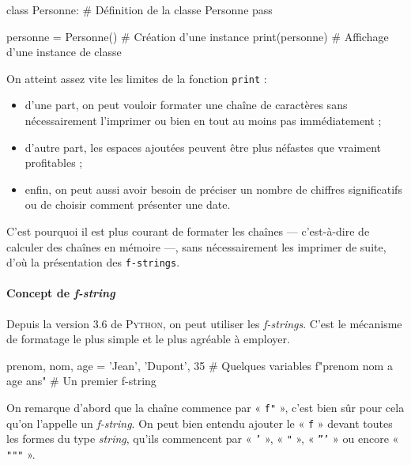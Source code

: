\begin{idleconsole}
\begin{pyconsole}
class Personne: # Définition de la classe Personne
	pass

personne = Personne() # Création d'une instance
print(personne) # Affichage d'une instance de classe
\end{pyconsole}
\end{idleconsole}

On atteint assez vite les limites de la fonction \texttt{print} :
\begin{itemize}
\item d'une part, on peut vouloir formater une chaîne de caractères sans nécessairement l'imprimer ou bien en tout au moins pas immédiatement ;
\item d'autre part, les espaces ajoutées peuvent être plus néfastes que vraiment profitables ;
\item enfin, on peut aussi avoir besoin de préciser un nombre de chif\-fres significatifs ou de choisir comment présenter une date.
\end{itemize}

C'est pourquoi il est plus courant de formater les chaînes --- c'est-à-dire de calculer des chaînes en mémoire ---, sans nécessairement les imprimer de suite, d'où la présentation des \texttt{f-strings}.

\paragraph{Concept de \textit{f-string}}
Depuis la version 3.6 de \textsc{Python}, on peut utiliser les \textit{f-strings}. C'est le mécanisme de formatage le plus simple et le plus agréable à employer.

\begin{idleconsole}
	\begin{pyconsole}
		prenom, nom, age = 'Jean', 'Dupont', 35 # Quelques variables
		f"{prenom} {nom} a {age} ans" # Un premier f-string
	\end{pyconsole}
\end{idleconsole}

On remarque d'abord que la chaîne commence par « \texttt{f"} », c'est bien sûr pour cela qu'on l'appelle un \textit{f-string}.
On peut bien entendu ajouter le « \texttt{f} » devant toutes les formes du type \textit{string}, qu'ils commencent par « \texttt{'} », « \texttt{"} », « \texttt{'''} » ou encore « \texttt{"""} ».

